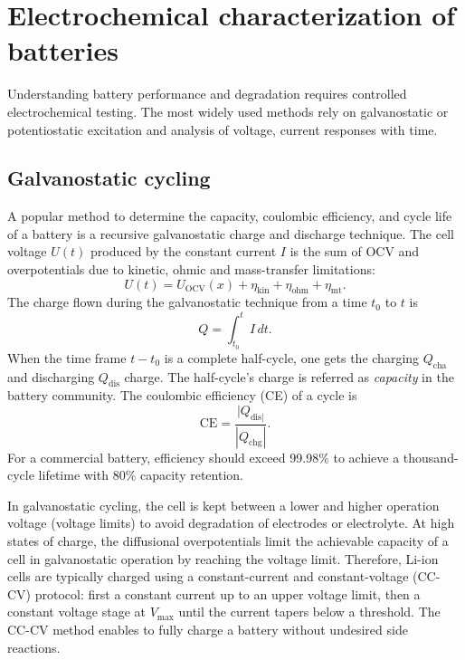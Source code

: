 \section{Electrochemical characterization of batteries}

Understanding battery performance and degradation requires controlled electrochemical testing. 
The most widely used methods rely on galvanostatic or potentiostatic excitation and analysis of voltage, current responses with time.

\subsection{Galvanostatic cycling}

A popular method to determine the capacity, coulombic efficiency, and cycle life of a battery is a recursive galvanostatic charge and discharge technique. 
The cell voltage $U(t)$ produced by the constant current $I$ is the sum of OCV and overpotentials due to kinetic, ohmic and mass-transfer limitations:
\begin{equation}
    U(t) = U_{\mathrm{OCV}}(x) + \eta_{\mathrm{kin}} + \eta_{\mathrm{ohm}} + \eta_{\mathrm{mt}}.
\end{equation}
The charge flown during the galvanostatic technique from a time $t_0$ to $t$ is
\begin{equation}
    Q = \int_{t_0}^t I\, dt.
\end{equation}
When the time frame $t-t_0$ is a complete half-cycle, one gets the charging $Q_{\mathrm{cha}}$ and discharging $Q_{\mathrm{dis}}$ charge.
The half-cycle's charge is referred as \emph{capacity} in the battery community. 
The coulombic efficiency (CE) of a cycle is
\begin{equation}
    \mathrm{CE} = \frac{|Q_{\mathrm{dis}|}}{|Q_{\mathrm{chg}}|}.
\end{equation}
For a commercial battery, efficiency should exceed 99.98\% to achieve a thousand-cycle lifetime with 80\% capacity retention.

In galvanostatic cycling, the cell is kept between a lower and higher operation voltage (voltage limits) to avoid degradation of electrodes or electrolyte.
At high states of charge, the diffusional overpotentials limit the achievable capacity of a cell in galvanostatic operation by reaching the voltage limit.
Therefore, Li-ion cells are typically charged using a constant-current and constant-voltage (CC-CV) protocol: first a constant current up to an upper voltage limit, then a constant voltage stage at $V_{\max}$ until the current tapers below a threshold. 
The CC-CV method enables to fully charge a battery without undesired side reactions.

